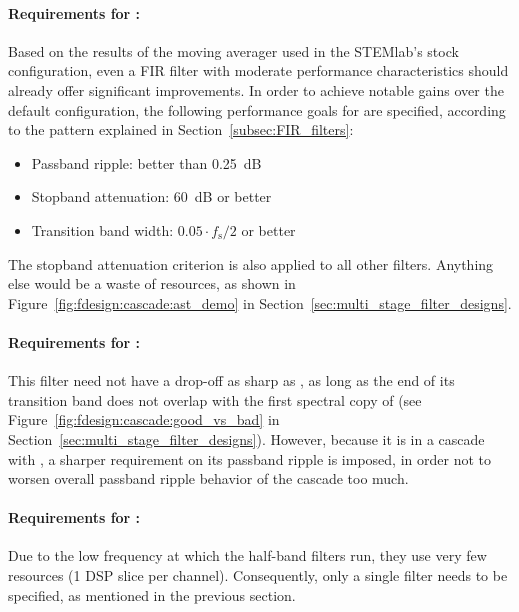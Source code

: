 \clearpage
\paragraph{Requirements  for   :}   Based   on  the   results  of
the  moving  averager   used  in  the  STEMlab's   stock  configuration,  even
a  FIR  filter  with   moderate  performance  characteristics  should  already
offer   significant   improvements. In   order  to   achieve   notable   gains
over  the   default  configuration,   the  following  performance   goals  for
   are  specified,   according  to   the  pattern   explained  in
Section~\ref{subsec:FIR_filters}:
\begin{itemize}\tightlist
    \item
        Passband ripple: better than \SI{0.25}{\dB}
    \item
        Stopband attenuation: \SI{60}{\dB} or better
    \item
        Transition band width: $0.05 \cdot f_\mathrm{s}/2$ or better
\end{itemize}
The     stopband    attenuation     criterion    is     also    applied     to
all    other     filters. Anything    else    would    be     a    waste    of
resources,   as   shown    in   Figure~\ref{fig:fdesign:cascade:ast_demo}   in
Section~\ref{sec:multi_stage_filter_designs}.

\paragraph{Requirements   for  :} This   filter   need  not   have
a   drop-off  as   sharp   as   ,  as   long   as   the  end   of
its   transition   band   does   not   overlap   with   the   first   spectral
copy  of   (see  Figure~\ref{fig:fdesign:cascade:good_vs_bad}  in
Section~\ref{sec:multi_stage_filter_designs}).   However, because  it is  in a
cascade with  , a sharper  requirement on its passband  ripple is
imposed,  in order  not  to worsen  overall passband  ripple  behavior of  the
cascade too much.

\paragraph{Requirements for :} Due to  the low frequency at which
the half-band filters run, they use  very few resources (\num{1} DSP slice per
channel).   Consequently, only  a  single  filter needs  to  be specified,  as
mentioned in the previous section.


